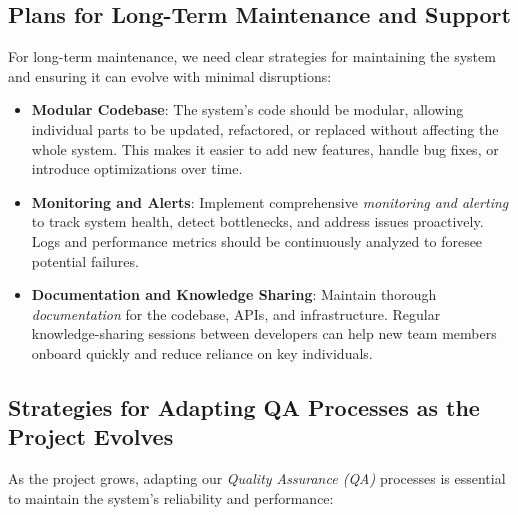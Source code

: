 \documentclass{article}
\begin{document}
\subsection{Plans for Long-Term Maintenance and Support}

For long-term maintenance, we need clear strategies for maintaining the system and ensuring it can evolve with minimal disruptions:

\begin{itemize}
    \item \textbf{Modular Codebase}: The system’s code should be modular, allowing individual parts to be updated, refactored, or replaced without affecting the whole system. This makes it easier to add new features, handle bug fixes, or introduce optimizations over time.
    \item \textbf{Monitoring and Alerts}: Implement comprehensive \textit{monitoring and alerting} to track system health, detect bottlenecks, and address issues proactively. Logs and performance metrics should be continuously analyzed to foresee potential failures.
    \item \textbf{Documentation and Knowledge Sharing}: Maintain thorough \textit{documentation} for the codebase, APIs, and infrastructure. Regular knowledge-sharing sessions between developers can help new team members onboard quickly and reduce reliance on key individuals.
\end{itemize}

\subsection{Strategies for Adapting QA Processes as the Project Evolves}

As the project grows, adapting our \textit{Quality Assurance (QA)} processes is essential to maintain the system’s reliability and performance:
\end{document}
